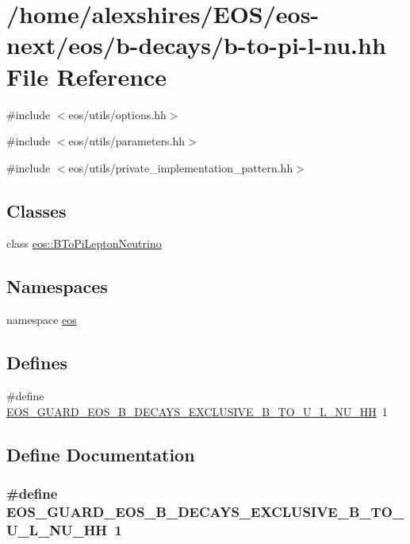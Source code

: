 \hypertarget{b-to-pi-l-nu_8hh}{
\section{/home/alexshires/EOS/eos-\/next/eos/b-\/decays/b-\/to-\/pi-\/l-\/nu.hh File Reference}
\label{b-to-pi-l-nu_8hh}
}
{\ttfamily \#include $<$eos/utils/options.hh$>$}\par
{\ttfamily \#include $<$eos/utils/parameters.hh$>$}\par
{\ttfamily \#include $<$eos/utils/private\_\-implementation\_\-pattern.hh$>$}\par
\subsection*{Classes}
\begin{DoxyCompactItemize}
\item 
class \hyperlink{classeos_1_1BToPiLeptonNeutrino}{eos::BToPiLeptonNeutrino}
\end{DoxyCompactItemize}
\subsection*{Namespaces}
\begin{DoxyCompactItemize}
\item 
namespace \hyperlink{namespaceeos}{eos}
\end{DoxyCompactItemize}
\subsection*{Defines}
\begin{DoxyCompactItemize}
\item 
\#define \hyperlink{b-to-pi-l-nu_8hh_a930cd2713bbe38b25f42dcc307d9da2e}{EOS\_\-GUARD\_\-EOS\_\-B\_\-DECAYS\_\-EXCLUSIVE\_\-B\_\-TO\_\-U\_\-L\_\-NU\_\-HH}~1
\end{DoxyCompactItemize}


\subsection{Define Documentation}
\hypertarget{b-to-pi-l-nu_8hh_a930cd2713bbe38b25f42dcc307d9da2e}{
\subsubsection[{EOS\_\-GUARD\_\-EOS\_\-B\_\-DECAYS\_\-EXCLUSIVE\_\-B\_\-TO\_\-U\_\-L\_\-NU\_\-HH}]{\setlength{\rightskip}{0pt plus 5cm}\#define EOS\_\-GUARD\_\-EOS\_\-B\_\-DECAYS\_\-EXCLUSIVE\_\-B\_\-TO\_\-U\_\-L\_\-NU\_\-HH~1}}
\label{b-to-pi-l-nu_8hh_a930cd2713bbe38b25f42dcc307d9da2e}
